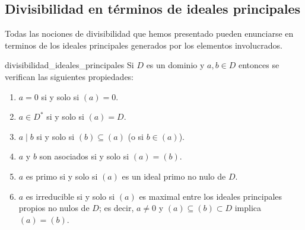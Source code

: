 \clearpage
\subsection{Divisibilidad en términos de ideales principales}

Todas las nociones de divisibilidad que hemos presentado pueden enunciarse en terminos de los ideales principales generados por los elementos involucrados.

\begin{proposition}{}{divisibilidad_ideales_principales}
Si \(D\) es un dominio y \(a, b \in D\) entonces se verifican las siguientes propiedades:

\begin{enumerate}
\item \(a = 0\) si y solo si \((a) = 0\).

\item \(a \in D^*\) si y solo si \((a) = D\).

\item \(a \mid b\) si y solo si \((b) \subseteq (a)\) (o si \(b \in (a)\)).

\item \(a\) y \(b\) son asociados si y solo si \((a) = (b)\).

\item \(a\) es primo si y solo si \((a)\) es un ideal primo no nulo de \(D\).

\item \(a\) es irreducible si y solo si \((a)\) es maximal entre los ideales principales propios no nulos de \(D\); es decir, \(a \neq 0\) y \((a) \subseteq (b) \subset D\) implica \((a) = (b)\).
\end{enumerate}

\end{proposition}

